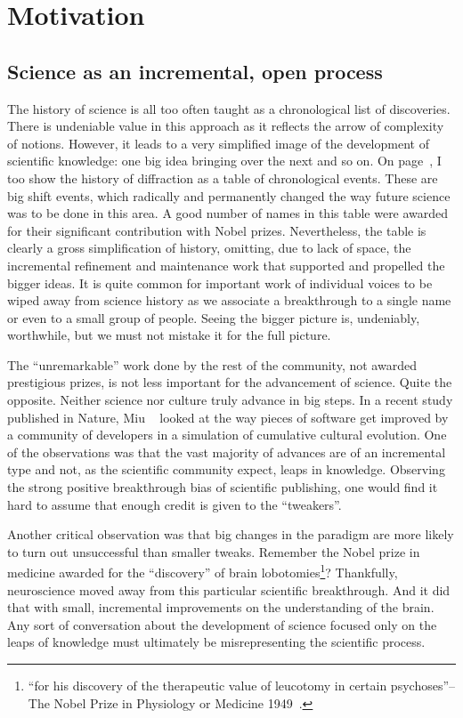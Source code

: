 \chapter{Motivation}

\section{Science as an incremental, open process}

The history of science is all too often taught as a chronological list of discoveries. There is undeniable value in this approach as it reflects the arrow of complexity of notions. However, it leads to a very simplified image of the development of scientific knowledge: one big idea bringing over the next and so on. On page~\pageref{table:historyDiff}, I too show the history of diffraction as a table of chronological events. These are big shift events, which radically and permanently changed the way future science was to be done in this area. A good number of names in this table were awarded for their significant contribution with Nobel prizes. Nevertheless, the table is clearly a gross simplification of history, omitting, due to lack of space, the incremental refinement and maintenance work that supported and propelled the bigger ideas. It is quite common for important work of individual voices to be wiped away from science history as we associate a breakthrough to a single name or even to a small group of people. Seeing the bigger picture is, undeniably, worthwhile, but we must not mistake it for the full picture.

The ``unremarkable'' work done by the rest of the community, not awarded prestigious prizes, is not less important for the advancement of science. Quite the opposite. Neither science nor culture truly advance in big steps. In a recent study published in Nature, Miu \etal~\cite{Miu2018} looked at the way pieces of software get improved by a community of developers in a simulation of cumulative cultural evolution. One of the observations was that the vast majority of advances are of an incremental type and not, as the scientific community expect, leaps in knowledge. Observing the strong positive breakthrough bias of scientific publishing, one would find it hard to assume that enough credit is given to the ``tweakers''. 

Another critical observation was that big changes in the paradigm are more likely to turn out unsuccessful than smaller tweaks. Remember the Nobel prize in medicine awarded for the ``discovery'' of brain lobotomies\footnote{ ``for his discovery of the therapeutic value of leucotomy in certain psychoses''-- The Nobel Prize in Physiology or Medicine 1949~\cite{Nobel49}.}? Thankfully, neuroscience moved away from this particular scientific breakthrough. And it did that with small, incremental improvements on the understanding of the brain. Any sort of conversation about the development of science focused only on the leaps of knowledge must ultimately be misrepresenting the scientific process.


